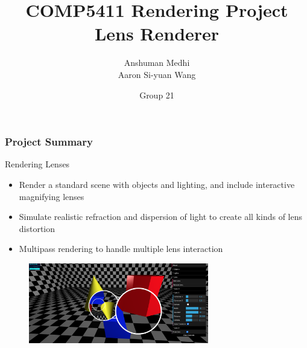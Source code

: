 \documentclass{beamer}
\title[COMP5411 Rendering Project]{COMP5411 Rendering Project \\ Lens Renderer}
\author[Anshuman \& Aaron]{Anshuman Medhi \\ Aaron Si-yuan Wang}
\date{Group 21}
\begin{document}
\frame{\titlepage}

\begin{frame}
    \frametitle{Project Summary}
    \begin{block}{Rendering Lenses}
       \begin{itemize}
        \item Render a standard scene with objects and lighting, and include interactive magnifying lenses
        \item Simulate realistic refraction and dispersion of light to create all kinds of lens distortion
        \item Multipass rendering to handle multiple lens interaction
       \end{itemize} 
    \end{block}
\begin{figure}[htpb]
    \centering
        \includegraphics[width=0.7\textwidth]{images/main}
    \end{figure}
\end{frame}
\end{document}
